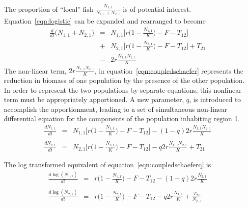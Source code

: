 \documentclass[12pt,letterpaper]{article}
\newcommand\help[1]{\color{Magenta}{\it #1 }\normalcolor}
\newcommand\None{{N_{1,1}}}
\newcommand\Ntwo{{N_{2,1}}}
\newcommand\Nsum{{N_{1,1}+N_{2,1}}}
\begin{document}
The proportion of ``local'' fish $\frac{\None}{\Nsum}$ is of potential interest.
Equation~\ref{eqn:logistic} can be expanded and rearranged to become
\begin{eqnarray}
\label{eqn:coupledschaefer}
\frac{d}{dt}\big(\Nsum\big) &=&\None\Big[r\Big(1-\frac{\None}{K}\Big)
-F - T_{12}\Big] \nonumber\\
&+&\Ntwo\Big[r\Big(1-\frac{\Ntwo}{K}\Big)
-F - T_{12}\Big]  + T_{21}\\
&-& 2r\frac{\None\Ntwo}{K}\nonumber
\end{eqnarray}
The non-linear term, $2r\frac{\None\Ntwo}{K}$, in
equation~\ref{eqn:coupledschaefer} represents the reduction in biomass
of one population by the presence of the other population.
In order to represent
the two populations by separate equations, this
nonlinear term must be appropriately apportioned.
A new parameter, $q$, is introduced to accomplish the apportionment,
leading to a set of simultaneous non-linear differential equation for the
components of the population inhabiting region 1.
\begin{eqnarray}
\label{eqn:coupledschaeferq}
\frac{d\None}{dt}&=&\None\Big[r\Big(1-\frac{\None}{K}\Big)
-F - T_{12}\Big] - (1-q)2r\frac{\None\Ntwo}{K}\nonumber\\
\\
\frac{d\Ntwo}{dt}&=&\Ntwo\Big[r\Big(1-\frac{\Ntwo}{K}\Big)
-F - T_{12}\Big] - q2r\frac{\None\Ntwo}{K} + T_{21}\nonumber
\end{eqnarray}
\help{Does this system have any meaningful equilibrium?}


The log transformed equivalent of equation~\ref{eqn:coupledschaeferq}
is
\begin{eqnarray}
\label{eqn:coupledlogschaefer}
\frac{d\log(\None)}{dt}&=&r\Big(1-\frac{\None}{K}\Big) -F - T_{12} -
(1-q)2r\frac{\Ntwo}{K}\nonumber\\
\\
\frac{d\log(\Ntwo)}{dt}&=&r\Big(1-\frac{\Ntwo}{K}\Big) -F - T_{12} -
q2r\frac{\None}{K} + \frac{T_{21}}{\Ntwo}\nonumber
\end{eqnarray}
\end{document}

